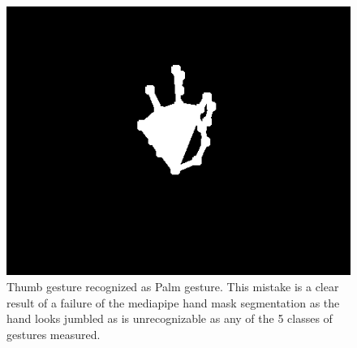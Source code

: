 \documentclass{article}
\begin{document}
\begin{figure}
  \centering
  \includegraphics[width=\linewidth]{input3.png}
  \caption*{Thumb gesture recognized as Palm gesture. This
  mistake is a clear result of a failure of the mediapipe hand mask segmentation as the hand
  looks jumbled as is unrecognizable as any of the 5 classes of gestures measured.}
\end{figure}
  


\nocite{Aurangzeb2023, Mahmood2024, Miron2019, Panduranga2018, Premaratne2014, Dalal2005}

\end{document}
